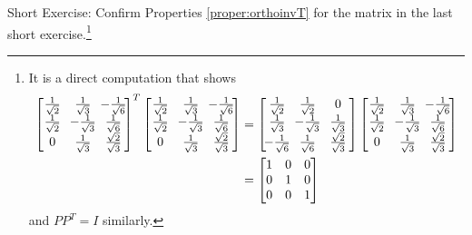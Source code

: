 Short Exercise: Confirm Properties \ref{proper:orthoinvT} for the matrix in the last short exercise.\footnote{It is a direct computation that shows
\begin{align*}
\left[\begin{array}{@{}wc{14pt}wc{14pt}wc{14pt}@{\,}}
\frac{1}{\sqrt{2}} & \frac{1}{\sqrt{3}} & -\frac{1}{\sqrt{6}} \\
\frac{1}{\sqrt{2}} & -\frac{1}{\sqrt{3}} & \frac{1}{\sqrt{6}} \\
0 & \frac{1}{\sqrt{3}} & \frac{\sqrt{2}}{\sqrt{3}}
\end{array}\right]^T
\left[\begin{array}{@{}wc{14pt}wc{14pt}wc{14pt}@{\,}}
\frac{1}{\sqrt{2}} & \frac{1}{\sqrt{3}} & -\frac{1}{\sqrt{6}} \\
\frac{1}{\sqrt{2}} & -\frac{1}{\sqrt{3}} & \frac{1}{\sqrt{6}} \\
0 & \frac{1}{\sqrt{3}} & \frac{\sqrt{2}}{\sqrt{3}}
\end{array}\right] &=
\left[\begin{array}{@{\,}wc{14pt}wc{14pt}wc{14pt}@{\,}}
\frac{1}{\sqrt{2}} & \frac{1}{\sqrt{2}} & 0 \\
\frac{1}{\sqrt{3}} & -\frac{1}{\sqrt{3}} & \frac{1}{\sqrt{3}} \\
-\frac{1}{\sqrt{6}} & \frac{1}{\sqrt{6}} & \frac{\sqrt{2}}{\sqrt{3}}
\end{array}\right]
\left[\begin{array}{@{}wc{14pt}wc{14pt}wc{14pt}@{\,}}
\frac{1}{\sqrt{2}} & \frac{1}{\sqrt{3}} & -\frac{1}{\sqrt{6}} \\
\frac{1}{\sqrt{2}} & -\frac{1}{\sqrt{3}} & \frac{1}{\sqrt{6}} \\
0 & \frac{1}{\sqrt{3}} & \frac{\sqrt{2}}{\sqrt{3}}
\end{array}\right] \\
&=
\begin{bmatrix}
1 & 0 & 0 \\
0 & 1 & 0 \\
0 & 0 & 1
\end{bmatrix}
\end{align*}
and $PP^T = I$ similarly.}

